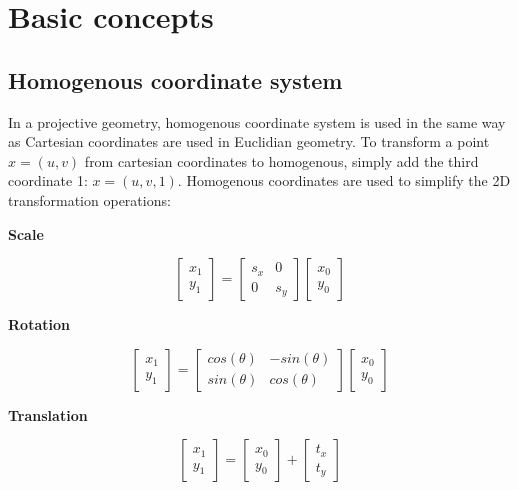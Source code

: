 \chapter{Basic concepts}
\label{chapter:epipilar_geo}

\section{Homogenous coordinate system}

In a projective geometry, homogenous coordinate system is used in the same way as Cartesian coordinates are used in Euclidian geometry. 
To transform a point $x=(u, v)$ from cartesian coordinates to homogenous, simply add the third coordinate 1: $x=(u, v, 1)$.
Homogenous coordinates are used to simplify the 2D transformation operations:

\begin{center}
    \textbf{Scale}
\end{center}
$$
\begin{bmatrix}
    x_1 \\ y_1
\end{bmatrix} = 
\begin{bmatrix}
    s_x & 0 \\
    0 & s_y
\end{bmatrix}
\begin{bmatrix}
    x_0 \\ y_0
\end{bmatrix}
$$ 
\begin{center}
    \textbf{Rotation}    
\end{center}
$$
\begin{bmatrix}
    x_1 \\ y_1
\end{bmatrix} = 
\begin{bmatrix}
    cos(\theta) & -sin(\theta) \\
    sin(\theta) & cos(\theta)
\end{bmatrix}
\begin{bmatrix}
    x_0 \\ y_0
\end{bmatrix}
$$
\begin{center}
    \textbf{Translation}    
\end{center}
$$
\begin{bmatrix}
    x_1 \\ y_1
\end{bmatrix} = 
\begin{bmatrix}
    x_0 \\ y_0
\end{bmatrix} +
\begin{bmatrix}
    t_x \\ t_y
\end{bmatrix}
$$ 

